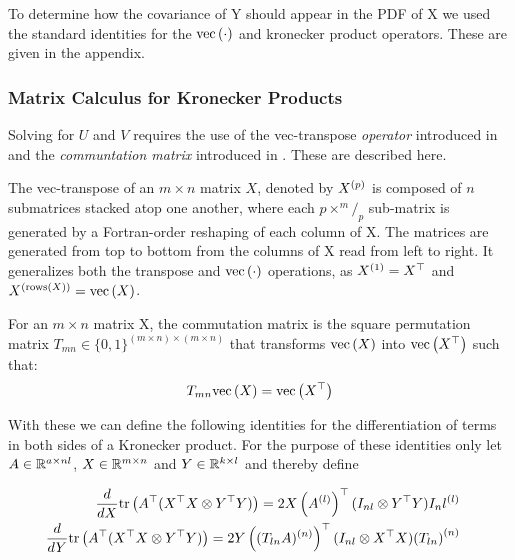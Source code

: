 To determine how the covariance of Y should appear in the PDF of X we used the standard identities for the $\text{vec}\left(\cdot\right)$ and kronecker product operators. These are given in the appendix.

\newcommand \mvy  { \vv{m}_{\vv{y}} }
\newcommand \sigvy { { S_Y } }

\newcommand \mmy  { M_Y      }
\newcommand \omy  { \Omega_Y }
\newcommand \sigy { \Sigma_Y }

\subsubsection*{Matrix Calculus for Kronecker Products}
Solving for $U$ and $V$ requires the use of the vec-transpose \emph{operator} introduced in \cite{Wandell1992} and the \emph {communtation matrix} introduced in \cite{Magnus1988}. These are described here.

The vec-transpose of an $m \times n$ matrix $X$, denoted by ${ X^{(p)} }$ is composed of $n$ submatrices stacked atop one another, where each $p \times ^m/_p$ sub-matrix is generated by a Fortran-order reshaping of each column of X. The matrices are generated from top to bottom from the columns of X read from left to right. It generalizes both the transpose and $\text{vec}\left(\cdot\right)$ operations, as ${ X^{(1)} } = X^\top$ and ${ X^{(\text{rows}(X))} } = \text{vec}\left(X\right)$.

For an $m \times n$ matrix X, the commutation matrix is the square permutation matrix $T_{mn} \in \{0,1\}^{(m \times n) \times (m \times n)}$ that transforms $\text{vec}\left(X\right)$ into $\text{vec}\left(X^\top\right)$ such that:
\begin{equation}
T_{mn} \text{vec}\left(X\right) = \text{vec}\left(X^\top\right)
\end{equation}

With these we can define the following identities for the differentiation of terms in both sides of a Kronecker product. For the purpose of these identities only let $A \in { \mathbb{R}^{a \times nl} }$, $X \in { \mathbb{R}^{m \times n} }$ and $Y \in { \mathbb{R}^{k \times l} }$ and thereby define

\begin{align}
\begin{split}
\frac{d}{dX} \text{tr} \left( {A^\top(X^\top X \otimes Y^\top Y)} \right) & = 2X \left({ A^{(l)} }\right)^\top (I_{nl} \otimes Y^\top Y) { I_nl^{(l)} } \label{eqn:lhs_kro_derivative_symm}
\end{split} \\
\begin{split}
\frac{d}{dY} \text{tr} \left( {A^\top(X^\top X \otimes Y^\top Y)} \right) & = 2 Y \left({ (T_{ln} A)^{(n)} }\right)^\top (I_{nl} \otimes X^\top X ) { \left( T_{ln} \right)^{(n)} } \label{eqn:rhs_kro_derivative_B_is_ident}
\end{split}
\end{align}

